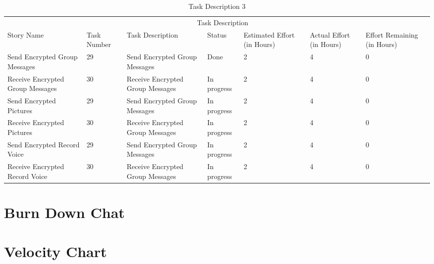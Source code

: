 \documentclass[a4paper]{article}
\begin{document}
\pagebreak


\begin{table} 
\begin{tabular}{p{3cm} p{1cm} p{3.5cm} p{1cm} p{1cm} p{1cm} p{1cm}} 
\hline %
& \multicolumn{5}{c}{Task Description} \\
\cmidrule(l){2-7}
Story Name & Task Number & Task Description & Status & Estimated Effort (in Hours) & Actual Effort (in Hours) & Effort Remaining (in Hours)\\ %
\hline

  Send Encrypted Group Messages & 29 & Send Encrypted Group Messages & Done & 2 & 4 & 0\\ 
 \midrule
 
 Receive Encrypted Group Messages & 30 & Receive Encrypted Group Messages & In progress & 2 & 4 & 0\\ 
 \midrule

 
  Send Encrypted Pictures & 29 & Send Encrypted Group Messages & In progress & 2 & 4 & 0\\ 
 \midrule
 
 Receive Encrypted Pictures & 30 & Receive Encrypted Group Messages & In progress & 2 & 4 & 0\\ 
 \midrule
 
  
  Send Encrypted Record Voice & 29 & Send Encrypted Group Messages & In progress & 2 & 4 & 0\\ 
 \midrule
 
 Receive Encrypted Record Voice & 30 & Receive Encrypted Group Messages & In progress & 2 & 4 & 0\\ 
\hline
\end{tabular}
\caption{Task Description 3} %
\label{tab:template} %
\end{table}

\newpage
\section{Burn Down Chat}

\pagebreak
\section{Velocity Chart}
\end{document}
